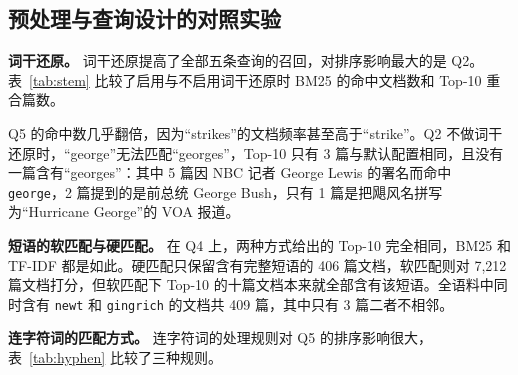 \documentclass[12pt,a4paper]{ctexart}
\begin{document}
\subsection{预处理与查询设计的对照实验}
\label{sec:ablation}

\textbf{词干还原。} 词干还原提高了全部五条查询的召回，对排序影响最大的是 Q2。表~\ref{tab:stem} 比较了启用与不启用词干还原时 BM25 的命中文档数和 Top-10 重合篇数。

\begin{table}[H]
\centering
\caption{词干还原对 BM25 检索的影响}
\label{tab:stem}
\end{table}

Q5 的命中数几乎翻倍，因为“strikes”的文档频率甚至高于“strike”。Q2 不做词干还原时，“george”无法匹配“georges”，Top-10 只有 3 篇与默认配置相同，且没有一篇含有“georges”：其中 5 篇因 NBC 记者 George Lewis 的署名而命中 \texttt{george}，2 篇提到的是前总统 George Bush，只有 1 篇是把飓风名拼写为“Hurricane George”的 VOA 报道。

\textbf{短语的软匹配与硬匹配。} 在 Q4 上，两种方式给出的 Top-10 完全相同，BM25 和 TF-IDF 都是如此。硬匹配只保留含有完整短语的 406 篇文档，软匹配则对 7,212 篇文档打分，但软匹配下 Top-10 的十篇文档本来就全部含有该短语。全语料中同时含有 \texttt{newt} 和 \texttt{gingrich} 的文档共 409 篇，其中只有 3 篇二者不相邻。

\textbf{连字符词的匹配方式。} 连字符词的处理规则对 Q5 的排序影响很大，表~\ref{tab:hyphen} 比较了三种规则。
\end{document}
